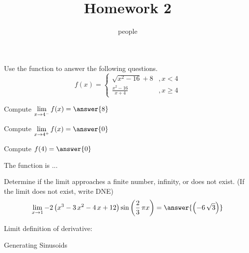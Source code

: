 \documentclass[•]{ximera}
\title{Homework 2}
\author{people}
\begin{document}
\maketitle

\begin{shuffle}%
\begin{exercise}

Use the function to answer the following questions.
\[f(x)=\left\{\begin{array}{ll}{{\sqrt{x^{2} - 16} + 8}}&,x<{{4}}\\[5pt]
{{\frac{x^{2} - 16}{x + 4}}}&,x\geq{{4}}
\end{array}\right.\]
\begin{shuffle}%
\begin{problem}
Compute $\lim\limits_{x\to{{4}}^-}f(x)=\answer{{{8}}}$\\[1in]
\end{problem}
\begin{problem}
Compute $\lim\limits_{x\to{{4}}^+}f(x)=\answer{{{0}}}$\\[1in]
\end{problem}
\begin{problem}
Compute $f({{4}})=\answer{{{0}}}$\\[1in]
\end{problem}
\begin{problem}
The function is ...
\begin{multipleChoice}
\end{multipleChoice}
\end{problem}
\end{shuffle}
\end{exercise}%





\begin{exercise}
Determine if the limit approaches a finite number, infinity, or does not exist. (If the limit does not exist, write DNE)
\[\lim_{x\to{{1}}}{{-2 \, {\left(x^{3} - 3 \, x^{2} - 4 \, x + 12\right)} \sin\left(\frac{2}{3} \, \pi x\right)}}=\answer{{{\left(-6 \, \sqrt{3}\right)}}}\]

\end{exercise}%
\end{shuffle}


Limit definition of derivative:

\vspace{0.5in}

Generating Sinusoids
\end{document}
